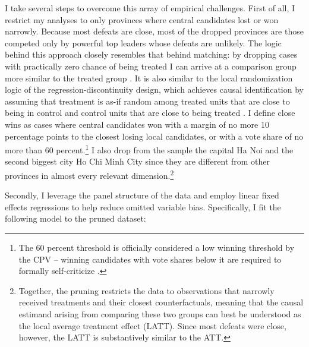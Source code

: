 \documentclass[12pt]{article}
\newcommand{\1}{\mathbbm{1}}
\begin{document}
I take several steps to overcome this array of empirical challenges.  First of all, I restrict my analyses to only provinces where central candidates lost or won narrowly. Because most defeats are close, most of the dropped provinces are those competed only by powerful top leaders whose defeats are unlikely. The logic behind this approach closely resembles that behind matching: by dropping cases with practically zero chance of being treated I can arrive at a comparison group more similar to the treated group \citep{Hoetal2007Matching}. It is also similar to the local randomization logic of the regression-discontinuity design, which achieves causal identification by assuming that treatment is as-if random among treated units that are close to being in control and control units that are close to being treated \citep{CattaneoTitiunik2015}. I define close wins as cases where central candidates won with a margin of no more 10 percentage points to the closest losing local candidates, or with a vote share of no more than 60 percent.\footnote{The 60 percent threshold is officially considered a low winning threshold by the CPV – winning candidates with vote shares below it are required to formally self-criticize \citep{MaleskySchuler2011}.} I also drop from the sample the capital Ha Noi and the second biggest city Ho Chi Minh City since they are different from other provinces in almost every relevant dimension.\footnote{Together, the pruning restricts the data to observations that narrowly received treatments and their closest counterfactuals, meaning that the causal estimand arising from comparing these two groups can best be understood as the local average treatment effect (LATT). Since most defeats were close, however, the LATT is substantively similar to the ATT.}

Secondly, I leverage the panel structure of the data and employ linear fixed effects regressions to help reduce omitted variable bias. Specifically, I fit the following model to the pruned dataset:
\end{document}
